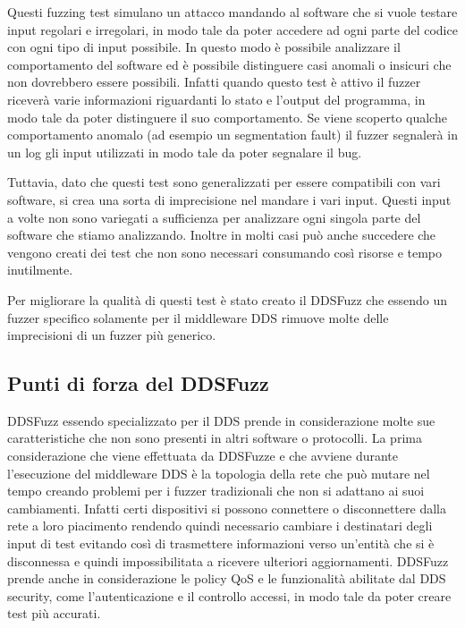 Questi fuzzing test simulano un attacco mandando al software
che si vuole testare input regolari e irregolari, 
in modo tale da poter 
accedere ad ogni parte del codice con ogni tipo di input possibile.
In questo modo è possibile analizzare il comportamento del software
ed è possibile distinguere casi anomali o insicuri che non dovrebbero
essere possibili. Infatti quando questo test è attivo il fuzzer riceverà
varie informazioni riguardanti lo stato e l'output del programma, in 
modo tale da poter distinguere il suo comportamento. Se viene scoperto
qualche comportamento anomalo (ad esempio un segmentation fault) il 
fuzzer segnalerà in un log gli input utilizzati in modo tale da poter 
segnalare il bug.

Tuttavia, dato che questi test sono generalizzati per essere compatibili
con vari software, si crea una sorta di imprecisione nel mandare i vari 
input. Questi input a volte non sono variegati a sufficienza 
per analizzare ogni singola parte del software che stiamo analizzando.
Inoltre in molti casi può anche succedere che vengono creati
dei test che non sono necessari consumando
così risorse e tempo inutilmente.

Per migliorare la qualità di questi test è stato 
creato il DDSFuzz che essendo un fuzzer specifico solamente per 
il middleware DDS rimuove molte delle imprecisioni di un fuzzer 
più generico.

\subsection{Punti di forza del DDSFuzz}
DDSFuzz essendo specializzato per il DDS prende in considerazione 
molte sue caratteristiche che non sono presenti in altri software
o protocolli. La prima considerazione che viene 
effettuata da DDSFuzze e 
che avviene durante l'esecuzione del middleware DDS è
la topologia della rete che può mutare nel tempo creando problemi per i
fuzzer tradizionali che non si adattano ai suoi cambiamenti. Infatti certi
dispositivi si possono connettere o disconnettere dalla rete a loro 
piacimento rendendo quindi necessario cambiare i destinatari 
degli input di test 
evitando così di trasmettere informazioni verso un'entità 
che si è disconnessa e quindi impossibilitata a ricevere ulteriori
aggiornamenti. DDSFuzz prende anche in considerazione le
policy QoS e 
le funzionalità abilitate dal DDS security, come
l'autenticazione e il controllo accessi, in modo tale da
poter creare test più accurati. 

